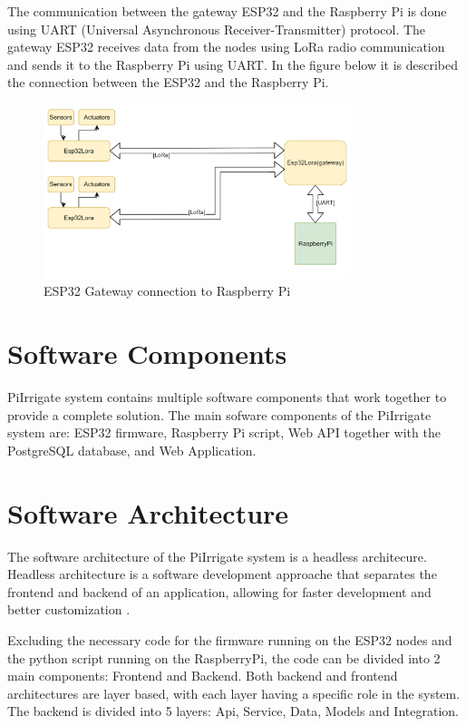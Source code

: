 The communication between the gateway ESP32 and the Raspberry Pi is done using UART (Universal Asynchronous Receiver-Transmitter) protocol.
The gateway ESP32 receives data from the nodes using LoRa radio communication and sends it to the Raspberry Pi using UART.
In the figure below it is described the connection between the ESP32 and the Raspberry Pi.

\begin{figure}[H]
    \centering
    \includegraphics[width=0.8\textwidth]{images/hardware-architecture.png}
    \caption{ESP32 Gateway connection to Raspberry Pi}
    \label{fig:esp32-gateway}
\end{figure}

\section{Software Components}
PiIrrigate system contains multiple software components that work together to provide a complete solution.
The main sofware components of the PiIrrigate system are: ESP32 firmware, Raspberry Pi script, 
Web API together with the PostgreSQL database, and Web Application.

\section {Software Architecture}
The software architecture of the PiIrrigate system is a headless architecure. Headless architecture is a software development
approache that separates the frontend and backend of an application, allowing for faster development and better 
customization \cite{headlessArchitecture}.

Excluding the necessary code for the firmware running on the ESP32 nodes and the python script
running on the RaspberryPi, the code can be divided into 2 main components: Frontend and Backend. 
Both backend and frontend architectures are layer based, with each layer having a specific role in the system.
The backend is divided into 5 layers: Api, Service, Data, Models and Integration.

